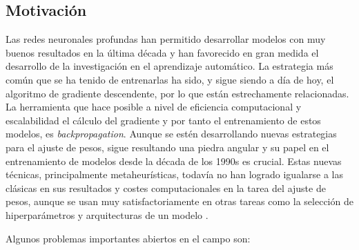 

\subsection{Motivación}

Las redes neuronales profundas han permitido desarrollar modelos con muy buenos resultados en la última década y han favorecido en gran medida el desarrollo de la investigación en el aprendizaje automático. La estrategia más común que se ha tenido de entrenarlas ha sido, y sigue siendo a día de hoy, el algoritmo de gradiente descendente, por lo que están estrechamente relacionadas. La herramienta que hace posible a nivel de eficiencia computacional y escalabilidad el cálculo del gradiente y por tanto el entrenamiento de estos modelos, es \textit{backpropagation}. Aunque se estén desarrollando nuevas estrategias \cite{Metaheuristics_train} para el ajuste de pesos, sigue resultando una piedra angular y su papel en el entrenamiento de modelos desde la década de los 1990s es crucial. Estas nuevas técnicas, principalmente metaheurísticas, todavía no han logrado igualarse a las clásicas en sus resultados y costes computacionales en la tarea del ajuste de pesos, aunque se usan muy satisfactoriamente en otras tareas como la selección de hiperparámetros y arquitecturas de un modelo \cite{MHforNeuralArchAndHyper}.

Algunos problemas importantes abiertos en el campo son:


